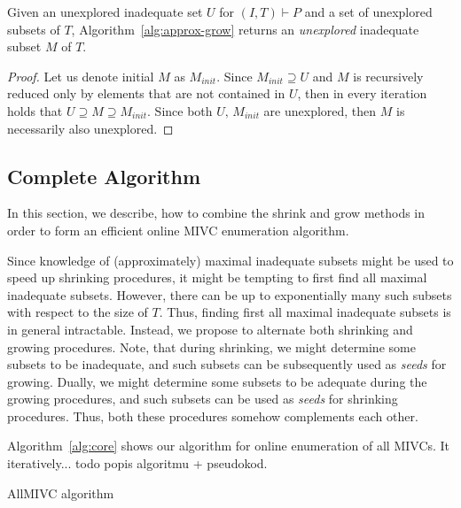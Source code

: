 \begin{proposition}
Given an unexplored inadequate set $U$ for $(I,T) \vdash P$ and a set of unexplored subsets of $T$, Algorithm~\ref{alg:approx-grow} returns an \emph{unexplored} inadequate subset $M$ of $T$.
\end{proposition}

\begin{proof}
Let us denote initial $M$ as $M_{init}$. Since $M_{init} \supseteq U$ and $M$ is recursively reduced only by elements that are not contained in $U$, then in every iteration holds that $U \supseteq M \supseteq M_{init}$. Since both $U, \, M_{init}$ are unexplored, then $M$ is necessarily also unexplored. 
\end{proof}


\subsection{Complete Algorithm}
In this section, we describe, how to combine the shrink and grow methods in order to form an efficient online MIVC enumeration algorithm.

Since knowledge of (approximately) maximal inadequate subsets might be used to speed up shrinking procedures, it might be tempting to first find all maximal inadequate subsets. However, there can be up to exponentially many such subsets with respect to the size of $T$. Thus, finding first all maximal inadequate subsets is in general intractable. Instead, we propose to alternate both shrinking and growing procedures. Note, that during shrinking, we might determine some subsets to be inadequate, and such subsets can be subsequently used as \emph{seeds} for growing. Dually, we might determine some subsets to be adequate during the growing procedures, and such subsets can be used as \emph{seeds} for shrinking procedures. Thus, both these procedures somehow complements each other. 

Algorithm~\ref{alg:core} shows our algorithm for online enumeration of all MIVCs. It iteratively... todo popis algoritmu + pseudokod. 


\begin{algorithm}[!t]

\caption{AllMIVC algorithm}
\end{algorithm}




 